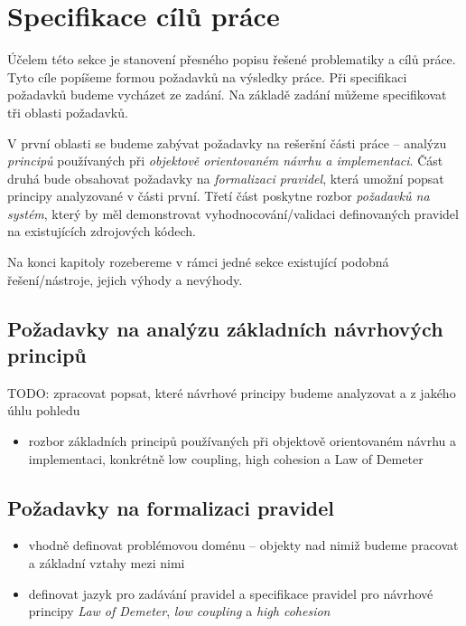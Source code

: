 \chapter{Specifikace cílů práce}

Účelem této sekce je stanovení přesného popisu řešené problematiky a cílů práce. Tyto cíle popíšeme formou požadavků na výsledky práce. Při specifikaci požadavků budeme vycházet ze zadání. Na základě zadání můžeme specifikovat tři oblasti požadavků.

V první oblasti se budeme zabývat požadavky na rešeršní části práce -- analýzu \emph{principů} používaných při \emph{objektově orientovaném návrhu a implementaci}. Část druhá bude obsahovat požadavky na \emph{formalizaci pravidel}, která umožní popsat principy analyzované v části první. Třetí část poskytne rozbor \emph{požadavků na systém}, který by měl demonstrovat vyhodnocování/validaci definovaných pravidel na existujících zdrojových kódech.

Na konci kapitoly rozebereme v rámci jedné sekce existující podobná řešení/nástroje, jejich výhody a nevýhody.

\section{Požadavky na analýzu základních návrhových principů}

TODO: zpracovat
popsat, které návrhové principy budeme analyzovat a z jakého úhlu pohledu

\begin{itemize}
\item rozbor základních principů používaných při objektově orientovaném návrhu a implementaci, konkrétně low coupling, high cohesion a Law of Demeter
\end{itemize}

\section{Požadavky na formalizaci pravidel}

\begin{itemize}
\item vhodně definovat problémovou doménu -- objekty nad nimiž budeme pracovat a základní vztahy mezi nimi
\item definovat jazyk pro zadávání pravidel a specifikace pravidel pro návrhové principy \emph{Law of Demeter}, \emph{low coupling} a \emph{high cohesion}
\end{itemize}

